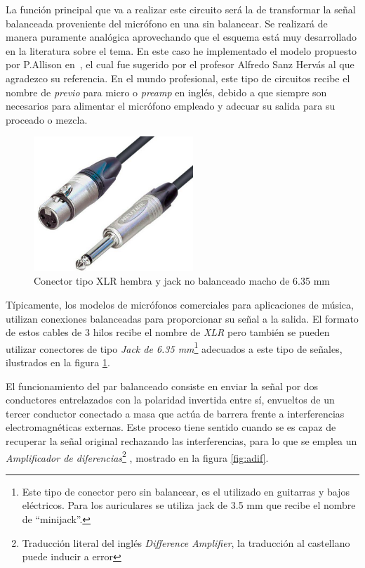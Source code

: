 La función principal que va a realizar este circuito será la de transformar la señal balanceada proveniente del micrófono en una sin balancear. Se realizará de manera puramente analógica aprovechando que el esquema está muy desarrollado en la literatura sobre el tema. En este caso he implementado el modelo propuesto por P.Allison en~\cite{Preamp}, el cual fue sugerido por el profesor Alfredo Sanz Hervás al que agradezco su referencia. En el mundo profesional, este tipo de circuitos recibe el nombre de \emph{previo} para micro o \emph{preamp} en inglés, debido a que siempre son necesarios para alimentar el micrófono empleado y adecuar su salida para su proceado o mezcla.

\begin{figure}[!htb]
\begin{center}
\includegraphics[width=6cm]{img/canonyjack.png}
\caption{\label{fig:conec}Conector tipo XLR hembra y jack no balanceado macho de 6.35 mm}
\end{center}
\end{figure}

Típicamente, los modelos de micrófonos comerciales para aplicaciones de música, utilizan conexiones balanceadas para proporcionar su señal a la salida. El formato de estos cables de 3 hilos recibe el nombre de \emph{XLR} pero también se pueden utilizar conectores de tipo \emph{Jack de 6.35 mm}\footnote{Este tipo de conector pero sin balancear, es el utilizado en guitarras y bajos eléctricos. Para los auriculares se utiliza jack de 3.5 mm que recibe el nombre de ``minijack''.} adecuados a este tipo de señales, ilustrados en la figura \ref{fig:conec}.

El funcionamiento del par balanceado consiste en enviar la señal por dos conductores entrelazados con la polaridad invertida entre sí, envueltos de un tercer conductor conectado a masa que actúa de barrera frente a interferencias electromagnéticas externas. Este proceso tiene sentido cuando se es capaz de recuperar la señal original rechazando las interferencias, para lo que se emplea un \emph{Amplificador de diferencias}\footnote{Traducción literal del inglés \emph{Difference Amplifier}, la traducción al castellano puede inducir a error} \cite{sfranco}, mostrado en la figura \ref{fig:adif}. 

